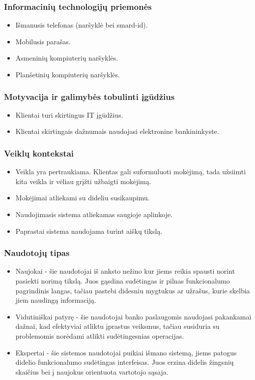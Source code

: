 \documentclass{VUMIFPSkursinis}
\begin{document}
\subsubsection{Informacinių technologijų priemonės}
\begin{itemize}
	\item Išmanusis telefonas (naršyklė bei smard-id).
	\item Mobilusis parašas.
	\item Asmeninių kompiuterių naršyklės.
	\item Planšetinių kompiuterių naršyklės.
\end{itemize}
\subsubsection{Motyvacija ir galimybės tobulinti įgūdžius}
\begin{itemize}
	\item Klientai turi skirtingus IT įgūdžius.
	\item Klientai skirtingais dažnumais naudojasi elektronine bankininkyste.
\end{itemize}
\subsubsection{Veiklų kontekstai}
\begin{itemize}
	\item Veikla yra pertraukiama. Klientas gali suformuluoti mokėjimą, tada užsiimti kita veikla ir vėliau grįžti užbaigti mokėjimą.
	\item Mokėjimai atliekami su dideliu susikaupimu.
	\item Naudojimasis sistema atliekamas saugioje aplinkoje.
	\item Paprastai sistema naudojama turint aiškų tikslą.
\end{itemize}
\subsubsection{Naudotojų tipas}
\begin{itemize}
	\item Naujokai - šie naudotojai iš anksto nežino kur jiems reikia spausti norint pasiekti norimą tikslą. Juos gąsdina sudėtingas ir pilnas funkcionalumo pagrindinis langas, tačiau pastebi didesniu mygtukus ar užrašus, kurie skelbia jiem naudingą informaciją.
	\item Vidutiniškai patyrę - šie naudotojai banko paslaugomis naudojasi pakankamai dažnai, kad efektyviai atliktu įprastus veiksmus, tačiau susiduria su problemomis norėdami atlikti sudėtingesnias operacijas.
	\item Ekspertai - šie sistemos naudotojai puikiai išmano sistemą, jiems patogus didelio funkcionalumo sudėtingas interfeisas. Juos erzina didelis žingsnių skaičius bei į naujokus orientuota vartotojo sąsaja.
\end{itemize}
\end{document}
